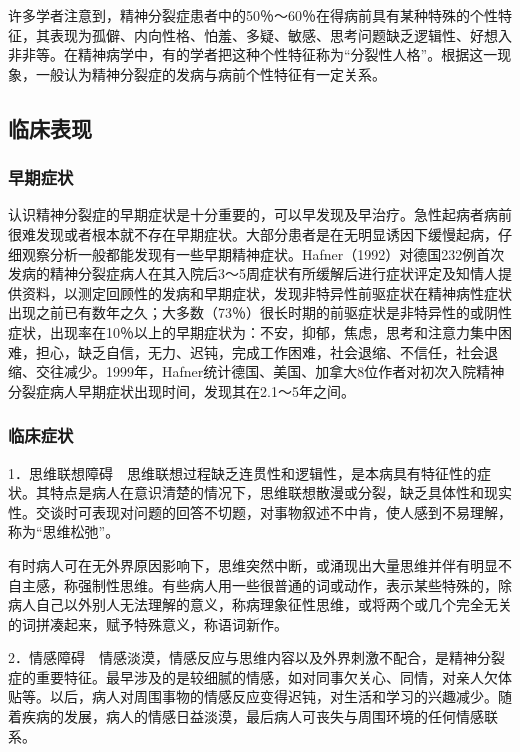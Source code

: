 许多学者注意到，精神分裂症患者中的50％～60％在得病前具有某种特殊的个性特征，其表现为孤僻、内向性格、怕羞、多疑、敏感、思考问题缺乏逻辑性、好想入非非等。在精神病学中，有的学者把这种个性特征称为“分裂性人格”。根据这一现象，一般认为精神分裂症的发病与病前个性特征有一定关系。

\subsection{临床表现}

\subsubsection{早期症状}

认识精神分裂症的早期症状是十分重要的，可以早发现及早治疗。急性起病者病前很难发现或者根本就不存在早期症状。大部分患者是在无明显诱因下缓慢起病，仔细观察分析一般都能发现有一些早期精神症状。Hafner（1992）对德国232例首次发病的精神分裂症病人在其入院后3～5周症状有所缓解后进行症状评定及知情人提供资料，以测定回顾性的发病和早期症状，发现非特异性前驱症状在精神病性症状出现之前已有数年之久；大多数（73％）很长时期的前驱症状是非特异性的或阴性症状，出现率在10％以上的早期症状为：不安，抑郁，焦虑，思考和注意力集中困难，担心，缺乏自信，无力、迟钝，完成工作困难，社会退缩、不信任，社会退缩、交往减少。1999年，Hafner统计德国、美国、加拿大8位作者对初次入院精神分裂症病人早期症状出现时间，发现其在2.1～5年之间。

\subsubsection{临床症状}

1．思维联想障碍　思维联想过程缺乏连贯性和逻辑性，是本病具有特征性的症状。其特点是病人在意识清楚的情况下，思维联想散漫或分裂，缺乏具体性和现实性。交谈时可表现对问题的回答不切题，对事物叙述不中肯，使人感到不易理解，称为“思维松弛”。

有时病人可在无外界原因影响下，思维突然中断，或涌现出大量思维并伴有明显不自主感，称强制性思维。有些病人用一些很普通的词或动作，表示某些特殊的，除病人自己以外别人无法理解的意义，称病理象征性思维，或将两个或几个完全无关的词拼凑起来，赋予特殊意义，称语词新作。

2．情感障碍　情感淡漠，情感反应与思维内容以及外界刺激不配合，是精神分裂症的重要特征。最早涉及的是较细腻的情感，如对同事欠关心、同情，对亲人欠体贴等。以后，病人对周围事物的情感反应变得迟钝，对生活和学习的兴趣减少。随着疾病的发展，病人的情感日益淡漠，最后病人可丧失与周围环境的任何情感联系。

